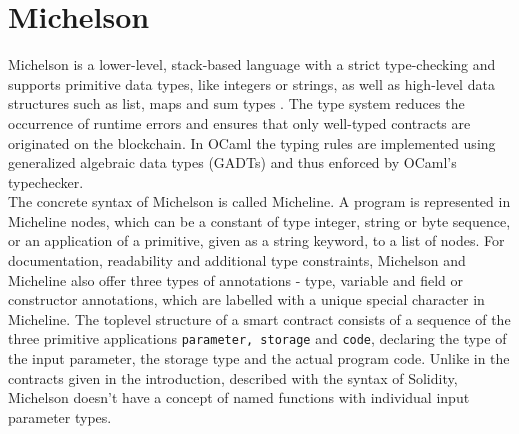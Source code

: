 \section{Michelson}
Michelson is a lower-level, stack-based language with a strict type-checking and supports primitive data types, like integers or strings, as well as high-level data structures such as list, maps and sum types \cite{tezos_docs_michelson}. The type system reduces the occurrence of runtime errors and ensures that only well-typed contracts are originated on the blockchain. In OCaml the typing rules are implemented using generalized algebraic data types (GADTs) \cite{tezos_docs_michelson} and thus enforced by OCaml's typechecker. \\
The concrete syntax of Michelson is called Micheline. A program is represented in Micheline nodes, which can be a constant of type integer, string or byte sequence, or an application of a primitive, given as a string keyword, to a list of nodes. For documentation, readability and additional type constraints, Michelson and Micheline also offer three types of annotations - type, variable and field or constructor annotations, which are labelled with a unique special character in Micheline. The toplevel structure of a smart contract consists of a sequence of the three primitive applications \texttt{parameter, storage} and \texttt{code}, declaring the type of the input parameter, the storage type and the actual program code. Unlike in the contracts given in the introduction, described with the syntax of Solidity, Michelson doesn't have a concept of named functions with individual input parameter types. 


